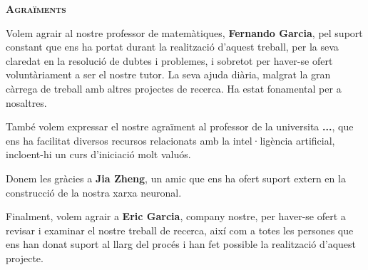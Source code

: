 \setlength{\parskip}{4pt}
\begin{modernquote}
\textsc{\textbf{Agraïments}}\par
{}
\raggedright
Volem agrair al nostre professor de matemàtiques, \textbf{Fernando Garcia}, pel suport constant que ens ha portat durant la realització d’aquest treball, per la seva claredat en la resolució de dubtes i problemes, i sobretot per haver-se ofert voluntàriament a ser el nostre tutor. La seva ajuda diària, malgrat la gran càrrega de treball amb altres projectes de recerca. Ha estat fonamental per a nosaltres.\par

També volem expressar el nostre agraïment al professor de la universita \textbf{...}, que ens ha facilitat diversos recursos relacionats amb la intel·ligència artificial, incloent-hi un curs d’iniciació molt valuós.\par

Donem les gràcies a \textbf{Jia Zheng}, un amic que ens ha ofert suport extern en la construcció de la nostra xarxa neuronal.\par

Finalment, volem agrair a \textbf{Eric Garcia}, company nostre, per haver-se ofert a revisar i examinar el nostre treball de recerca, així com a totes les persones que ens han donat suport al llarg del procés i han fet possible la realització d’aquest projecte.
\end{modernquote}
\clearpage
